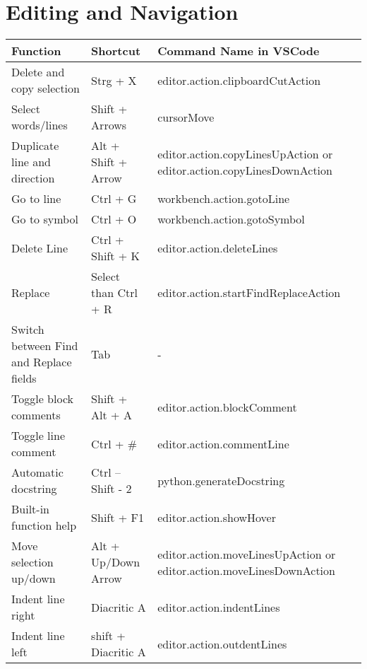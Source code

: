 \documentclass{article}
\begin{document}
\section*{Editing and Navigation}
\begin{longtable}{|p{6cm}|p{3cm}|p{7cm}|}
\hline
\rowcolor{white}
\textbf{Function} & \textbf{Shortcut} & \textbf{Command Name in VSCode} \\
\hline
Delete and copy selection & Strg + X & editor.action.clipboardCutAction \\
Select words/lines & Shift + Arrows & cursorMove \\
Duplicate line and direction & Alt + Shift + Arrow & editor.action.copyLinesUpAction or editor.action.copyLinesDownAction \\
Go to line & Ctrl + G & workbench.action.gotoLine \\
Go to symbol & Ctrl + O & workbench.action.gotoSymbol \\
Delete Line & Ctrl + Shift + K & editor.action.deleteLines \\
Replace & Select than Ctrl + R & editor.action.startFindReplaceAction \\
Switch between Find and Replace fields & Tab & - \\
Toggle block comments & Shift + Alt + A & editor.action.blockComment \\
Toggle line comment & Ctrl + \# & editor.action.commentLine \\
Automatic docstring & Ctrl – Shift - 2 & python.generateDocstring \\
Built-in function help & Shift + F1 & editor.action.showHover \\
Move selection up/down & Alt + Up/Down Arrow & editor.action.moveLinesUpAction or editor.action.moveLinesDownAction \\
Indent line right & Diacritic A & editor.action.indentLines \\
Indent line left & shift + Diacritic A & editor.action.outdentLines \\
\hline
\end{longtable}

\newpage
{}
\end{document}
